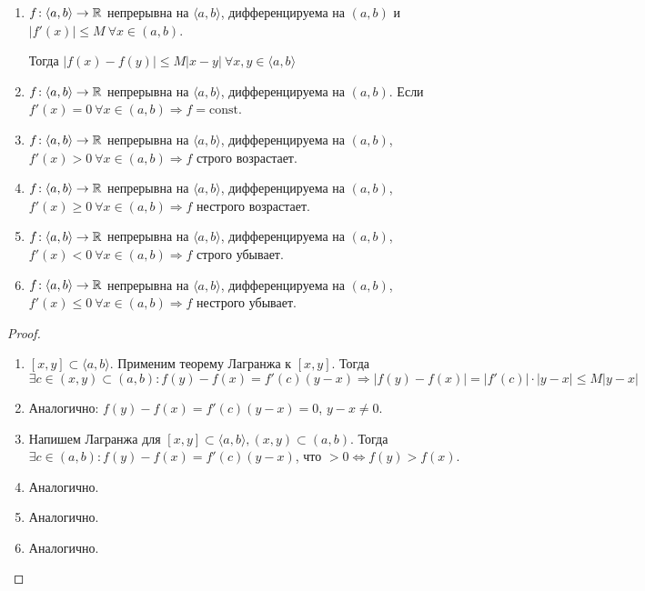 \begin{consequence}
    \slashn
    \begin{enumerate}
        \item $f\!:\langle a, b \rangle \to \mathbb{R}$ непрерывна на  $\langle a, b \rangle$, дифференцируема на $(a, b)$ и  $|f'(x)| \le M\ \forall x \in (a, b)$. 

            Тогда $|f(x) - f(y)| \le M|x-y|\ \forall x, y \in \langle a, b \rangle$ 
        \item  $f\!:\langle a, b \rangle \to \mathbb{R}$ непрерывна на  $\langle a, b \rangle$, дифференцируема на $(a, b)$. Если $f'(x) = 0\ \forall x \in (a, b) \Rightarrow f = \text{const}$. 
        \item  $f\!:\langle a, b \rangle \to \mathbb{R}$ непрерывна на  $\langle a, b \rangle$, дифференцируема на $(a, b)$, $f'(x) > 0\ \forall x \in (a, b) \Rightarrow f$ строго возрастает.
        \item  $f\!:\langle a, b \rangle \to \mathbb{R}$ непрерывна на  $\langle a, b \rangle$, дифференцируема на $(a, b)$, $f'(x) \ge 0\ \forall x \in (a, b) \Rightarrow f$ нестрого возрастает.
        \item  $f\!:\langle a, b \rangle \to \mathbb{R}$ непрерывна на  $\langle a, b \rangle$, дифференцируема на $(a, b)$, $f'(x) < 0\ \forall x \in (a, b) \Rightarrow f$ строго убывает.
        \item  $f\!:\langle a, b \rangle \to \mathbb{R}$ непрерывна на  $\langle a, b \rangle$, дифференцируема на $(a, b)$, $f'(x) \le 0\ \forall x \in (a, b) \Rightarrow f$ нестрого убывает.
    \end{enumerate}
\end{consequence}
\begin{proof}
\slashn
    \begin{enumerate}
        \item $[x, y] \subset \langle a, b \rangle$. Применим теорему Лагранжа к  $[x, y]$. Тогда  $\exists c \in (x, y) \subset (a, b)\!: f(y)-f(x) = f'(c)(y-x) \Rightarrow |f(y) - f(x)| = |f'(c)| \cdot |y-x| \le M|y-x|$ 
        \item Аналогично: $f(y)-f(x) = f'(c)(y - x) = 0$,  $y - x \neq 0$. 
        \item Напишем Лагранжа для $[x, y] \subset \langle a, b \rangle, (x, y) \subset (a, b)$. 
            Тогда  $\exists c \in (a, b)\!: f(y) - f(x) = f'(c)(y-x)$, что  $>0 \iff f(y) >f(x).$
        \item Аналогично.
        \item Аналогично.
        \item Аналогично.
    \end{enumerate}
\end{proof}
